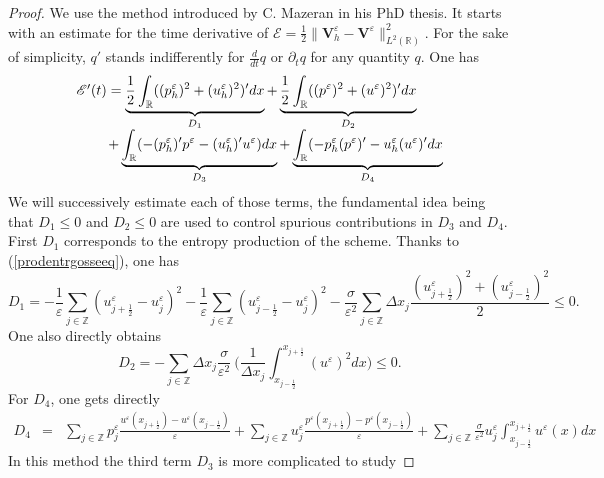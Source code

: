 \documentclass[a4paper,french,english,10pt]{article}
\newcommand\eps{\varepsilon}
\begin{document}
\begin{proof}
We  use the method introduced by C.
Mazeran \cite{Mazeran} in his PhD thesis.
It  starts with an estimate for the time derivative of
$\mathscr{E}=\frac12 \|\mathbf V_h^\eps - \mathbf V^\eps  \|^2_{L^2(\mathbb{R})}$.
For the sake of simplicity,   $q'$ stands indifferently for  $\frac{d}{dt}q $ or $\partial_t q $ for any quantity $q$. One has 
\begin{equation*}\label{esti}
\begin{array}{l}
\mathscr{E}'(t) = \underbrace{\frac12 
\int_{\mathbb{R}}((p_{h}^{\eps})^2+(u_{h}^{\eps})^2)'dx}_{D_1}+
\underbrace{\frac12 
\int_{\mathbb{R}}((p^{\eps})^2+(u^{\eps})^2)'dx}_{D_2} \\
\hspace{0.8cm}
+ \underbrace{\int_{\mathbb{R}}
(-(p_{h}^{\eps})'p^\eps-(u_{h}^{\eps})'u^\eps)dx}_{D_3} + \underbrace{\int_{\mathbb{R}}
(-p_{h}^{\eps}(p^{\eps})'-u_{h}^{\eps}(u^{\eps})'dx}_{D_4}
\end{array}
\end{equation*}
We will successively estimate each of those terms,
the fundamental idea being that
$D_1\leq 0$ and $D_2\leq 0$ are used to control 
spurious contributions in $D_3$ and $D_4$.
First $D_1$ corresponds to the
entropy production of the scheme. Thanks to (\ref{prodentrgosseeq}),
one has
\begin{equation*}
 D_1 = -\frac{1}{\eps}\sum_{j\in \mathbb{Z}}
(u_{j+\frac12 }^{\eps}-u^{\eps}_j)^2 -\frac{1}{\eps} \sum_{j\in
\mathbb{Z}}(u_{j-\frac12 }^{\eps}-u^{\eps}_j)^2-
\frac{\sigma}{\eps^2}\sum_{j\in \mathbb{Z}} \Delta x_{j}
\frac{(u_{j+\frac12 }^{\eps})^2+(u_{j-\frac12 }^{\eps})^2}{2}\leq 0.
\end{equation*}
One also directly obtains
\begin{equation*}
 D_2 = -\sum_{j\in \mathbb{Z}} \Delta x_j \frac{ \sigma }{\eps^2} \: \bigg(
\frac{1}{\Delta x_j}{\int_{x_{j-\frac12}}^{x_{j+\frac12}}}(u^{\eps})^2 dx \bigg)
\leq 0.
\end{equation*}
For $D_4$, one gets  directly
\begin{eqnarray*}
 D_4 &=& \sum_{j\in \mathbb{Z}} p^{\eps}_j
\frac{u^{\eps}(x_{j+\frac12 })-u^{\eps}(x_{j-\frac12 })}{\eps} +
\sum_{j\in \mathbb{Z}} u^{\eps}_j 
\frac{p^{\eps}(x_{j+\frac12 })-p^{\eps}(x_{j-\frac12 })}{\eps} +
\sum_{j\in \mathbb{Z}} \frac{\sigma}{\eps^2} u^{\eps}_j 
{\int_{x_{j-\frac12}}^{x_{j+\frac12}}} u^{\eps}(x) dx 
\end{eqnarray*}
In this method the third term
 $D_3$ is more complicated to study

\end{proof}
\end{document}
